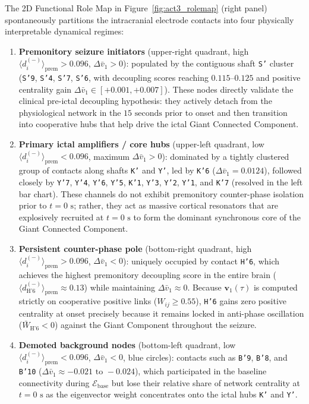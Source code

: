 The 2D Functional Role Map in Figure~\ref{fig:act3_rolemap} (right panel) spontaneously partitions the intracranial electrode contacts into four physically interpretable dynamical regimes:
\begin{enumerate}
    \item \textbf{Premonitory seizure initiators} (upper-right quadrant, high $\langle d_i^{(-)}\rangle_{\text{prem}} > 0.096$, $\Delta \bar{v}_1 > 0$): populated by the contiguous shaft \texttt{S'} cluster (\texttt{S'9}, \texttt{S'4}, \texttt{S'7}, \texttt{S'6}, with decoupling scores reaching $0.115\text{--}0.125$ and positive centrality gain $\Delta \bar{v}_1 \in [+0.001, +0.007]$). These nodes directly validate the clinical pre-ictal decoupling hypothesis: they actively detach from the physiological network in the $15\text{ seconds}$ prior to onset and then transition into cooperative hubs that help drive the ictal Giant Connected Component.
    \item \textbf{Primary ictal amplifiers / core hubs} (upper-left quadrant, low $\langle d_i^{(-)}\rangle_{\text{prem}} < 0.096$, maximum $\Delta \bar{v}_1 >0$): dominated by a tightly clustered group of contacts along shafts \texttt{K'} and \texttt{Y'}, led by \texttt{K'6} ($\Delta \bar{v}_1 = 0.0124$), followed closely by \texttt{Y'7}, \texttt{Y'4}, \texttt{Y'6}, \texttt{Y'5}, \texttt{K'1}, \texttt{Y'3}, \texttt{Y'2}, \texttt{Y'1}, and \texttt{K'7} (resolved in the left bar chart). These channels do not exhibit premonitory counter-phase isolation prior to $t = 0\text{ s}$; rather, they act as massive cortical resonators that are explosively recruited at $t = 0\text{ s}$ to form the dominant synchronous core of the Giant Connected Component.
    \item \textbf{Persistent counter-phase pole} (bottom-right quadrant, high $\langle d_i^{(-)}\rangle_{\text{prem}} > 0.096$, $\Delta \bar{v}_1 < 0$): uniquely occupied by contact \texttt{H'6}, which achieves the highest premonitory decoupling score in the entire brain ($\langle d_{\text{H'6}}^{(-)}\rangle_{\text{prem}} \approx 0.13$) while maintaining $\Delta \bar{v}_1 \approx 0$. Because $\mathbf{v}_1(\tau)$ is computed strictly on cooperative positive links ($W_{ij} \geq 0.55$), \texttt{H'6} gains zero positive centrality at onset precisely because it remains locked in anti-phase oscillation ($\bar{W}_{\text{H'6}} < 0$) against the Giant Component throughout the seizure.
    \item \textbf{Demoted background nodes} (bottom-left quadrant, low $\langle d_i^{(-)}\rangle_{\text{prem}} < 0.096$, $\Delta \bar{v}_1 < 0$, blue circles): contacts such as \texttt{B'9}, \texttt{B'8}, and \texttt{B'10} ($\Delta \bar{v}_1 \approx -0.021\text{ to }-0.024$), which participated in the baseline connectivity during $\mathcal{E}_{\text{base}}$ but lose their relative share of network centrality at $t = 0\text{ s}$ as the eigenvector weight concentrates onto the ictal hubs \texttt{K'} and \texttt{Y'}.
\end{enumerate}

